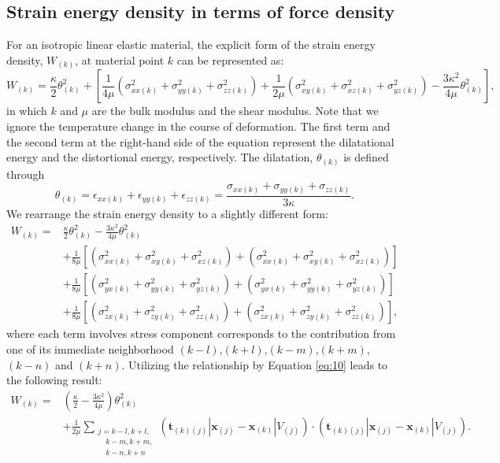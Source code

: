 \documentclass[11pt,fullpage]{article}
\newcommand{\mb}[1]{\mathbf{#1}}
\newcommand{\blue}[1]{#1}
\begin{document}
\subsection{Strain energy density in terms of force density}

For an isotropic linear elastic material, the explicit form of the strain energy density, $W_{(k)}$, at material point $k$ can be represented as:
\begin{equation}
W_{(k)} = \frac{\kappa}{2}\theta_{(k)}^2+\left[\frac{1}{4\mu}(\sigma_{xx(k)}^2+\sigma_{yy(k)}^2+\sigma_{zz(k)}^2)
                                         +\frac{1}{2\mu}(\sigma_{xy(k)}^2+\sigma_{xz(k)}^2+\sigma_{yz(k)}^2)
                                         -\frac{3\kappa^2}{4\mu}\theta_{(k)}^2
                                    \right],
\label{eq:14}
\end{equation}
in which $k$ and $\mu$ are the bulk modulus and the shear modulus. Note that we ignore the temperature change in the course of deformation. The first term and the second term at the right-hand side of the equation represent the dilatational energy and the distortional energy, respectively. The dilatation, $\theta_{(k)}$ is defined through
\begin{equation}
\theta_{(k)} = \epsilon_{xx(k)}+\epsilon_{yy(k)}+\epsilon_{zz(k)} = \frac{\sigma_{xx(k)}+\sigma_{yy(k)}+\sigma_{zz(k)}}{3\kappa}.
\label{eq:15}
\end{equation}
We rearrange the strain energy density to a slightly different form:
\begin{equation}
\begin{aligned}
W_{(k)} =& \frac{\kappa}{2}\theta_{(k)}^2 -\frac{3\kappa^2}{4\mu}\theta_{(k)}^2 \\
         &+\frac{1}{8\mu}\left[(\sigma_{xx(k)}^2+\sigma_{xy(k)}^2+\sigma_{xz(k)}^2) + (\sigma_{xx(k)}^2+\sigma_{xy(k)}^2+\sigma_{xz(k)}^2)\right]\\
         &+\frac{1}{8\mu}\left[(\sigma_{yx(k)}^2+\sigma_{yy(k)}^2+\sigma_{yz(k)}^2) + (\sigma_{yx(k)}^2+\sigma_{yy(k)}^2+\sigma_{yz(k)}^2)\right]\\
         &+\frac{1}{8\mu}\left[(\sigma_{zx(k)}^2+\sigma_{zy(k)}^2+\sigma_{zz(k)}^2) + (\sigma_{zx(k)}^2+\sigma_{zy(k)}^2+\sigma_{zz(k)}^2)\right],
\end{aligned}
\label{eq:16}
\end{equation}
where each term involves stress component corresponds to the contribution from one of its immediate neighborhood $(k-l)$,$(k+l)$,$(k-m)$,$(k+m)$,$(k-n)$ and $(k+n)$.
Utilizing the relationship by Equation \blue{\ref{eq:10}} leads to the following result:
\begin{equation}
\begin{aligned}
W_{(k)} =& (\frac{\kappa}{2} -\frac{3\kappa^2}{4\mu})\theta_{(k)}^2 \\
         &+\frac{1}{2\mu}\sum_{\substack {j=k-l,k+l,\\ \quad k-m,k+m,\\ \quad k-n,k+n}}(\mb{t}_{(k)(j)}|\mb{x}_{(j)}-\mb{x}_{(k)}|V_{(j)})\cdot(\mb{t}_{(k)(j)}|\mb{x}_{(j)}-\mb{x}_{(k)}|V_{(j)}).
\end{aligned}
\label{eq:17}
\end{equation}
\end{document}
